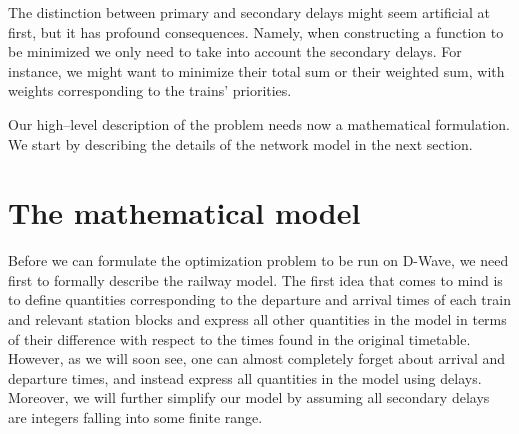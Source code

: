 The distinction between primary and secondary delays might seem artificial at
first, but it has profound consequences. Namely, when constructing a function
to be minimized we only need to take into account the secondary delays. For
instance, we might want to minimize their total sum or their weighted sum, with
weights corresponding to the trains' priorities.

Our high--level description of the problem needs now a mathematical
formulation. We start by describing the details of the network model in the
next section.

\section{The mathematical model}
Before we can formulate the optimization problem to be run on D-Wave, we need
first to formally describe the railway model. The first idea that comes to mind
is to define quantities corresponding to the departure and arrival times of each
train and relevant station blocks and express all other quantities in the
model in terms of their difference with respect to the times found in the
original timetable. However, as we will soon see, one can almost completely
forget about arrival and departure times, and instead express all quantities in
the model using delays. Moreover, we will further simplify our model by
assuming all secondary delays are integers falling into some finite range.

